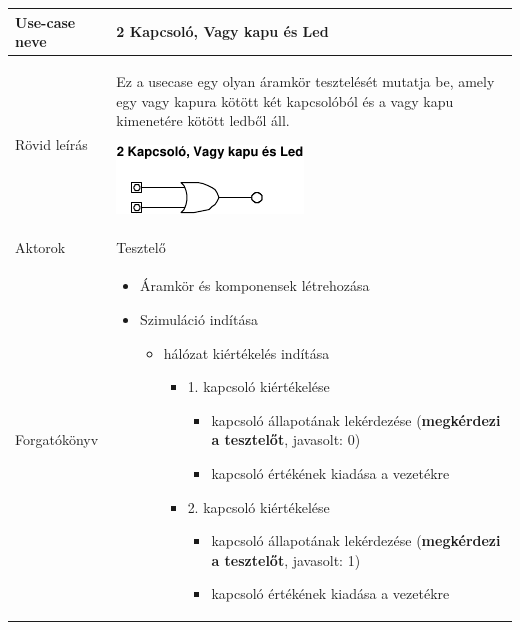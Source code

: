 	\begin{longtable}{| l | p{12cm} |}
	\hline
	\textbf{Use-case neve}   & {2 Kapcsoló, Vagy kapu és Led} \tabularnewline
	\hline\hline
	Rövid leírás    & {Ez a usecase egy olyan áramkör tesztelését mutatja be, amely egy vagy kapura kötött két kapcsolóból és a vagy kapu kimenetére kötött ledből áll.\newline
\begin{center}
\vspace{-15pt}
\includegraphics[scale=1.5]{dw/circuit_test3.pdf}
\vspace{-10pt}
\end{center}} \tabularnewline
	\hline
	Aktorok         & {Tesztelő} \tabularnewline
	\hline
	Forgatókönyv    &  \vspace{-15pt}
\begin{itemize}
\setlength{\itemsep}{0cm}%
\setlength{\parskip}{0cm}%
\setlength{\itemindent}{-15pt}%
\item Áramkör és komponensek létrehozása
\item Szimuláció indítása
\begin{itemize}
\setlength{\itemsep}{0cm}%
\setlength{\parskip}{0cm}%
\setlength{\itemindent}{-35pt}%
\item hálózat kiértékelés indítása
\begin{itemize}
\setlength{\itemsep}{0cm}%
\setlength{\parskip}{0cm}%
\setlength{\itemindent}{-50pt}%
	\item 1. kapcsoló kiértékelése
	\begin{itemize}
	\setlength{\itemsep}{0cm}%
	\setlength{\parskip}{0cm}%
	\setlength{\itemindent}{-60pt}%
		\item kapcsoló állapotának lekérdezése (\textbf{megkérdezi a tesztelőt}, javasolt: 0)
		\item kapcsoló értékének kiadása a vezetékre
	\end{itemize}
	\item 2. kapcsoló kiértékelése
	\begin{itemize}
	\setlength{\itemsep}{0cm}%
	\setlength{\parskip}{0cm}%
	\setlength{\itemindent}{-60pt}%
		\item kapcsoló állapotának lekérdezése (\textbf{megkérdezi a tesztelőt}, javasolt: 1)
		\item kapcsoló értékének kiadása a vezetékre

\end{itemize}
\end{itemize}
\end{itemize}
\end{itemize}
\end{longtable}
